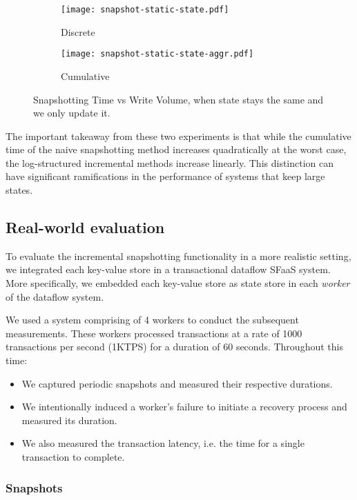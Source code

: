 \begin{figure}[h]
    \begin{subfigure}{.5\textwidth}
        \centering
        \texttt{[image: snapshot-static-state.pdf]}
        \caption{Discrete}
    \end{subfigure}
    \begin{subfigure}{.5\textwidth}
        \centering
        \texttt{[image: snapshot-static-state-aggr.pdf]}
        \caption{Cumulative}
    \end{subfigure}
    \caption{Snapshotting Time vs Write Volume, when state stays the same and we only update it.}
    \label{fig:snapshot-static-state}
\end{figure}

The important takeaway from these two experiments is that while the cumulative time of the naive snapshotting method increases quadratically at the worst case, the log-structured incremental methods increase linearly. This distinction can have significant ramifications in the performance of systems that keep large states.

\subsection{Real-world evaluation}
\label{section-real-world-evaluation}

To evaluate the incremental snapshotting functionality in a more realistic setting, we integrated each key-value store in a transactional dataflow SFaaS system. More specifically, we embedded each key-value store as state store in each \textit{worker} of the dataflow system.

We used a system comprising of 4 workers to conduct the subsequent measurements. These workers processed transactions at a rate of 1000 transactions per second (1KTPS) for a duration of 60 seconds. Throughout this time:

\begin{itemize}
    \item We captured periodic snapshots and measured their respective durations.
    \item We intentionally induced a worker's failure to initiate a recovery process and measured its duration.
    \item We also measured the transaction latency, i.e. the time for a single transaction to complete.
\end{itemize}

\subsubsection{Snapshots}

